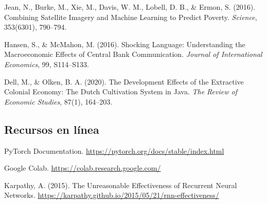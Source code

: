 \documentclass[11pt,a4paper]{article}
\begin{document}
Jean, N., Burke, M., Xie, M., Davis, W. M., Lobell, D. B., \& Ermon, S. (2016). Combining Satellite Imagery and Machine Learning to Predict Poverty. \textit{Science}, 353(6301), 790--794.

Hansen, S., \& McMahon, M. (2016). Shocking Language: Understanding the Macroeconomic Effects of Central Bank Communication. \textit{Journal of International Economics}, 99, S114--S133.

Dell, M., \& Olken, B. A. (2020). The Development Effects of the Extractive Colonial Economy: The Dutch Cultivation System in Java. \textit{The Review of Economic Studies}, 87(1), 164--203.

\subsection*{Recursos en l\'inea}

PyTorch Documentation. \url{https://pytorch.org/docs/stable/index.html}

Google Colab. \url{https://colab.research.google.com/}

Karpathy, A. (2015). The Unreasonable Effectiveness of Recurrent Neural Networks. \url{https://karpathy.github.io/2015/05/21/rnn-effectiveness/}
\end{document}
